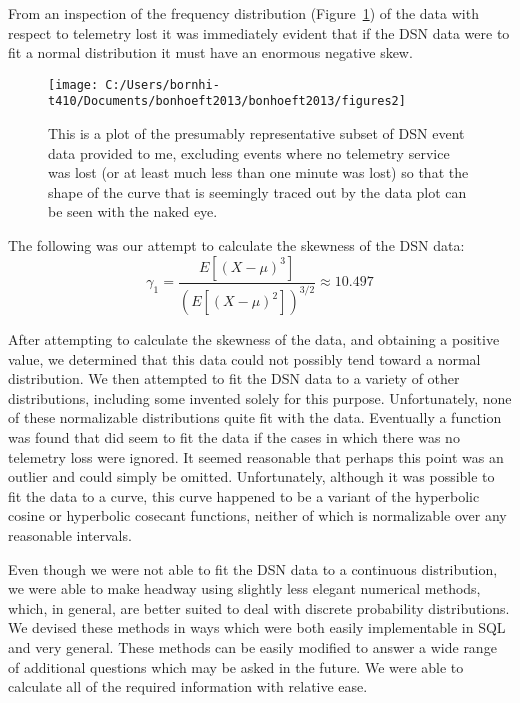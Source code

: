 \documentclass[aps,twocolumn,nobalancelastpage,amsmath,amssymb,
nofootinbib,superscriptaddress, ]{revtex4}
\begin{document}
From an inspection of the frequency distribution (Figure~\ref{fig:freqdist}) of the data with respect to telemetry lost it was immediately evident that if the DSN data were to fit a normal distribution it must have an enormous negative skew.

\begin{figure}[h]
\texttt{[image: C:/Users/bornhi-t410/Documents/bonhoeft2013/bonhoeft2013/figures2]}
\caption{This is a plot of the presumably representative subset of DSN event data  provided to me, excluding events where no telemetry service was lost (or at least much less than one minute was lost) so that the shape of the curve that is seemingly traced out by the data plot can be seen with the naked eye.\label{fig:freqdist}}
\end{figure}

The following was our attempt to calculate the skewness of the DSN data:
$$ \gamma_1 = \frac{E[(X - \mu)^3]}{(E[(X - \mu)^2])^{3/2}} \approx 10.497 $$

After attempting to calculate the skewness of the data, and obtaining a positive value, we determined that this data could not possibly tend toward a normal distribution. We then attempted to fit the DSN data to a variety of other distributions, including some invented solely for this purpose. Unfortunately, none of these normalizable distributions quite fit with the data. Eventually a function was found that did seem to fit the data if the cases in which there was no telemetry loss were ignored. It seemed reasonable that perhaps this point was an outlier and could simply be omitted. Unfortunately, although it was possible to fit the data to a curve, this curve happened to be a variant of the hyperbolic cosine or hyperbolic cosecant functions, neither of which is normalizable over any reasonable intervals.

Even though we were not able to fit the DSN data to a continuous distribution, we were able to make headway using slightly less elegant numerical methods, which, in general, are better suited to deal with discrete probability distributions. We devised these methods in ways which were both easily implementable in SQL and very general. These methods can be easily modified to answer a wide range of additional questions which may be asked in the future. We were able to calculate all of the required information with relative ease.
\end{document}
